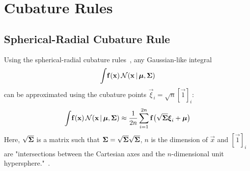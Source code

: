 \section{Cubature Rules}

\subsection{Spherical-Radial Cubature Rule}
	Using the spherical-radial cubature rules~\cite{solinCubatureIntegrationMethods2010}, any Gaussian-like integral
	\begin{equation*}
		\int\! \boldsymbol{\mathrm{f}}(\boldsymbol{\mathrm{x}}) \,\mathcal{N}(\boldsymbol{\mathrm{x}} \,\vert\, \boldsymbol{\mathrm{\mu}}, \boldsymbol{\mathrm{\Sigma}})
	\end{equation*}
	can be approximated using the cubature points \( \vec{\xi}_i = \sqrt{n} [\vec{1}]_i \):
	\begin{equation}
		\int\! \boldsymbol{\mathrm{f}}(\boldsymbol{\mathrm{x}}) \,\mathcal{N}(\boldsymbol{\mathrm{x}} \,\vert\, \boldsymbol{\mathrm{\mu}}, \boldsymbol{\mathrm{\Sigma}}) \approx \frac{1}{2n} \sum_{i = 1}^{2n} \boldsymbol{\mathrm{f}}\big( \sqrt{\boldsymbol{\mathrm{\Sigma}}} \boldsymbol{\mathrm{\xi}}_i + \boldsymbol{\mathrm{\mu}} \big)  \label{eqn:sphericalRadialGaussianCubatureRule}
	\end{equation}
	Here, \( \sqrt{\boldsymbol{\mathrm{\Sigma}}} \) is a matrix such that \( \boldsymbol{\mathrm{\Sigma}} = \sqrt{\boldsymbol{\mathrm{\Sigma}}} \sqrt{\boldsymbol{\mathrm{\Sigma}}} \), \(n\) is the dimension of \(\vec{x}\) and \( [\vec{1}]_i \) are "intersections between the Cartesian axes and the \(n\)-dimensional unit hypersphere."~\cite{solinCubatureIntegrationMethods2010}.
